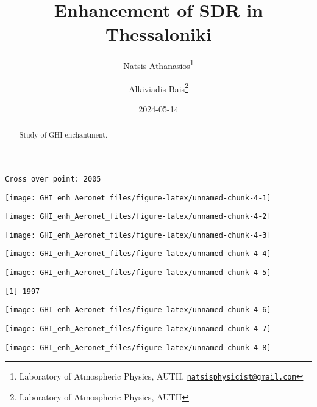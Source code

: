 \documentclass[
  10pt,
  a4paper,oneside]{article}
\title{Enhancement of SDR in Thessaloniki}
\author{Natsis Athanasios\footnote{Laboratory of Atmospheric Physics, AUTH, \href{mailto:natsisphysicist@gmail.com}{\nolinkurl{natsisphysicist@gmail.com}}} \and Alkiviadis Bais\footnote{Laboratory of Atmospheric Physics, AUTH}}
\date{2024-05-14}
\begin{document}
\maketitle
\begin{abstract}
Study of GHI enchantment.
\end{abstract}

{
\hypersetup{linkcolor=}
\setcounter{tocdepth}{4}
\tableofcontents
}
\begin{verbatim}
Cross over point: 2005 
\end{verbatim}

\begin{center}\texttt{[image: GHI\_enh\_Aeronet\_files/figure-latex/unnamed-chunk-4-1]} \end{center}

\begin{center}\texttt{[image: GHI\_enh\_Aeronet\_files/figure-latex/unnamed-chunk-4-2]} \end{center}

\begin{center}\texttt{[image: GHI\_enh\_Aeronet\_files/figure-latex/unnamed-chunk-4-3]} \end{center}

\begin{center}\texttt{[image: GHI\_enh\_Aeronet\_files/figure-latex/unnamed-chunk-4-4]} \end{center}

\begin{center}\texttt{[image: GHI\_enh\_Aeronet\_files/figure-latex/unnamed-chunk-4-5]} \end{center}

\begin{verbatim}
[1] 1997
\end{verbatim}

\begin{center}\texttt{[image: GHI\_enh\_Aeronet\_files/figure-latex/unnamed-chunk-4-6]} \end{center}

\begin{center}\texttt{[image: GHI\_enh\_Aeronet\_files/figure-latex/unnamed-chunk-4-7]} \end{center}

\begin{center}\texttt{[image: GHI\_enh\_Aeronet\_files/figure-latex/unnamed-chunk-4-8]} \end{center}
\end{document}
